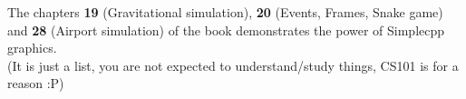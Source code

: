 \documentclass[../Problems]{subfiles}
\begin{document}

The chapters \textbf{19} (Gravitational simulation), \textbf{20} (Events, Frames, Snake game) and \textbf{28} (Airport simulation) of the book demonstrates the power of Simplecpp graphics.\\
(It is just a list, you are not expected to understand/study things, CS101 is for a reason :P)
\end{document}
